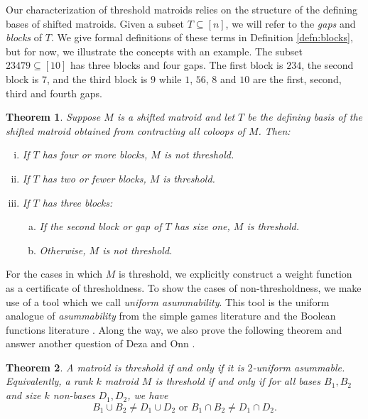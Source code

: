 \documentclass[10pt,a4paper]{amsart}
\makeatletter
\let\laneX@cite\cite
\renewcommand{\cite}{\protect\laneX@citenew}
\newcommand{\laneX@citenew}{\@ifnextchar[{\laneX@cite@a}{\laneX@cite@b}}
\def\laneX@cite@b#1{\laneX@cite{#1}}
\def\laneX@cite@a[#1]{\@ifnextchar[{\laneX@cite@c{#1}}{\laneX@cite@d{#1}}}
\def\laneX@cite@d#1#2{\laneX@cite[#1]{#2}}
\def\laneX@cite@c#1[#2]#3{[\unskip #1 \csname b@#3\endcsname, #2]}
\theoremstyle{definition}
\theoremstyle{plain}
\newtheorem{mainthrm}{Theorem}
\makeatother
\begin{document}
Our characterization of threshold matroids relies on the structure of the defining bases of shifted matroids. Given a subset $T\subseteq [n]$, we will refer to the \emph{gaps} and \emph{blocks} of $T$. We give formal definitions of these terms in Definition \ref{defn:blocks}, but for now, we illustrate the concepts with an example. The subset $23479\subseteq [10]$ has three blocks and four gaps. The first block is $234$, the second block is $7$, and the third block is $9$ while $1$, $56$, $8$ and $10$ are the first, second, third and fourth gaps. 
\begin{mainthrm}
  \label{thrm:main}
Suppose $M$ is a shifted matroid and let $T$ be the defining basis of the shifted matroid obtained from contracting all coloops of $M$.
Then:
\begin{enumerate}[i)]
\item If $T$ has four or more blocks, $M$ is not threshold.
\item If $T$ has two or fewer blocks, $M$ is threshold.
\item If $T$ has three blocks:
\begin{enumerate}[a)]
\item If the second block or gap of $T$ has size one, $M$ is threshold.
\item Otherwise, $M$ is not threshold. 
\end{enumerate}
\end{enumerate}
\end{mainthrm}

For the cases in which $M$ is threshold, we explicitly construct a weight function as a certificate of thresholdness. To show the cases of non-thresholdness, we make use of a tool which we call \emph{uniform asummability}. This tool is the uniform analogue of \emph{asummability} from the simple games literature \cite[Section $2.6$]{TZ} and the Boolean functions literature \cite[Chapter $9$]{Boolean}. Along the way, we also prove the following theorem and answer another question of Deza and Onn \cite[Question $1.1$ of][for matroids]{DO}.

\begin{mainthrm}
  \label{thrm:2-trade}
A matroid is threshold if and only if it is $2$-uniform asummable. Equivalently, a rank $k$ matroid $M$ is threshold if and only if for all bases $B_1,B_2$ and size $k$ non-bases $D_1,D_2$, we have 
\[B_1 \cup B_2 \neq D_1 \cup D_2 \text{ or } B_1\cap B_2 \neq D_1 \cap D_2. \]
\end{mainthrm}
\end{document}
